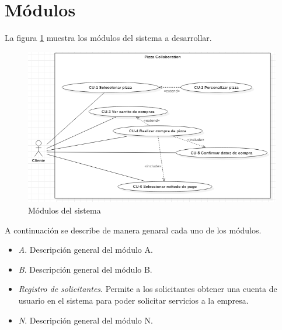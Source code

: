 
\section{Módulos}

	La figura \ref{modulos} muestra los módulos del sistema a desarrollar.

	\begin{figure}[h]
		
		\begin{center}

			\includegraphics[scale=0.60]{imagenes/modulos/Modulos-PizzaCollaboration.png}
			\caption{Módulos del sistema}
			\label{modulos}
			
		\end{center}
		
	\end{figure}

	A continuación se describe de manera genaral cada uno de los módulos.

	\begin{itemize}

		\item \textit{A}. Descripción general del módulo A.
		\item \textit{B}. Descripción general del módulo B.
		\item \textit{Registro de solicitantes}. Permite a los solicitantes obtener una cuenta de usuario en el sistema para poder solicitar servicios a la empresa.
		\item \textit{N}. Descripción general del módulo N.

	\end{itemize}


